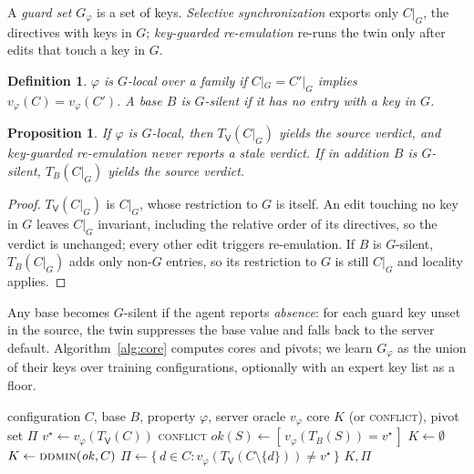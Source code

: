 \documentclass[conference]{IEEEtran}
\newtheorem{definition}{Definition}
\newtheorem{proposition}{Proposition}
\newcommand{\Vb}{\mathsf{V}}
\begin{document}
A \emph{guard set} $G_\varphi$ is a set of keys. \emph{Selective synchronization} exports only $C|_G$, the directives with keys in $G$; \emph{key-guarded re-emulation} re-runs the twin only after edits that touch a key in $G$.

\begin{definition}
$\varphi$ is \emph{$G$-local} over a family if $C|_G=C'|_G$ implies $v_\varphi(C)=v_\varphi(C')$. A base $B$ is \emph{$G$-silent} if it has no entry with a key in $G$.
\end{definition}

\begin{proposition}\label{prop:local}
If $\varphi$ is $G$-local, then $T_\Vb(C|_G)$ yields the source verdict, and key-guarded re-emulation never reports a stale verdict. If in addition $B$ is $G$-silent, $T_B(C|_G)$ yields the source verdict.
\end{proposition}
\begin{proof}
$T_\Vb(C|_G)$ is $C|_G$, whose restriction to $G$ is itself. An edit touching no key in $G$ leaves $C|_G$ invariant, including the relative order of its directives, so the verdict is unchanged; every other edit triggers re-emulation. If $B$ is $G$-silent, $T_B(C|_G)$ adds only non-$G$ entries, so its restriction to $G$ is still $C|_G$ and locality applies.
\end{proof}

Any base becomes $G$-silent if the agent reports \emph{absence}: for each guard key unset in the source, the twin suppresses the base value and falls back to the server default. Algorithm~\ref{alg:core} computes cores and pivots; we learn $G_\varphi$ as the union of their keys over training configurations, optionally with an expert key list as a floor.

\begin{algorithm}[t]
\caption{Fidelity core and pivots}\label{alg:core}
\begin{algorithmic}[1]
\Require configuration $C$, base $B$, property $\varphi$, server oracle $v_\varphi$
\Ensure core $K$ (or \textsc{conflict}), pivot set $\Pi$
\State $v^\star \gets v_\varphi(T_\Vb(C))$
 \Return \textsc{conflict}
\EndIf
\State $\mathit{ok}(S) \gets [\,v_\varphi(T_B(S)) = v^\star\,]$ 
 $K\gets\emptyset$ \Else\ $K \gets \textsc{ddmin}(\mathit{ok}, C)$ \EndIf
\State $\Pi \gets \{\, d\in C : v_\varphi(T_\Vb(C\setminus\{d\}))\neq v^\star \,\}$
\State \Return $K, \Pi$
\end{algorithmic}
\end{algorithm}
\end{document}
